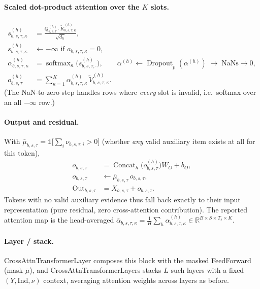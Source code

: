 \documentclass[stu,floatsintext]{apa7}
\newcommand{\R}{\mathbb{R}}
\newcommand{\softmax}{\operatorname{softmax}}
\newcommand{\Concat}{\operatorname{Concat}}
\begin{document}
\paragraph{Scaled dot-product attention over the $K$ slots.}
\begin{align}
  s_{b,s,\tau,\kappa}^{(h)} &= \frac{ Q^{(h)}_{b,s,\tau}\cdot \tilde K^{(h)}_{b,s,\tau,\kappa}}{\sqrt{d_h}},\\
  s_{b,s,\tau,\kappa}^{(h)} &\leftarrow -\infty \text{ if } a_{b,s,\tau,\kappa}=0, \\
  \alpha^{(h)}_{b,s,\tau,\kappa} &= \softmax_\kappa\bigl(s^{(h)}_{b,s,\tau,\cdot}\bigr), \qquad
  \alpha^{(h)} \leftarrow \operatorname{Dropout}_p(\alpha^{(h)}) \;\to\; \text{NaNs}\to 0, \\
  o^{(h)}_{b,s,\tau} &= \sum_{\kappa=1}^{K}\alpha^{(h)}_{b,s,\tau,\kappa}\, \tilde V^{(h)}_{b,s,\tau,\kappa}.
\end{align}
(The NaN-to-zero step handles rows where \emph{every} slot is invalid, i.e.\ softmax over an all
$-\infty$ row.)

\paragraph{Output and residual.} With $\bar\mu_{b,s,\tau} = \mathbb 1\bigl[\sum_i \nu_{b,s,\tau,i}>0\bigr]$
(whether \emph{any} valid auxiliary item exists at all for this token),
\begin{align}
  o_{b,s,\tau} &= \Concat_h\bigl(o^{(h)}_{b,s,\tau}\bigr) W_O + b_O, \\
  o_{b,s,\tau} &\leftarrow \bar\mu_{b,s,\tau}\, o_{b,s,\tau}, \\
  \operatorname{Out}_{b,s,\tau} &= X_{b,s,\tau} + o_{b,s,\tau}.
\end{align}
Tokens with no valid auxiliary evidence thus fall back exactly to their input representation (pure
residual, zero cross-attention contribution). The reported attention map is the head-averaged
$\bar\alpha_{b,s,\tau,\kappa} = \tfrac1H\sum_h \alpha^{(h)}_{b,s,\tau,\kappa}\in\R^{B\times S\times T_s\times K}$.

\paragraph{Layer / stack.} CrossAttnTransformerLayer composes this block with the masked
FeedForward (mask $\bar\mu$), and CrossAttnTransformerLayers stacks $L$
such layers with a fixed $(Y,\mathrm{Ind},\nu)$ context, averaging attention weights across layers as
before.
\end{document}
